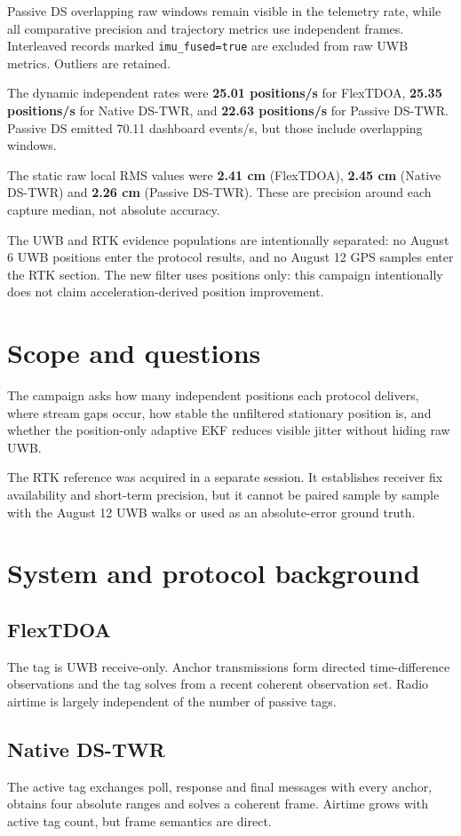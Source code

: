 \documentclass[10pt,a4paper]{article}
\begin{document}
Passive DS overlapping raw windows remain visible in the telemetry rate, while
all comparative precision and trajectory metrics use independent frames.
Interleaved records marked \texttt{imu\_fused=true} are excluded from raw UWB
metrics. Outliers are retained.

The dynamic independent rates were \textbf{25.01 positions/s} for FlexTDOA, \textbf{25.35 positions/s} for Native DS-TWR, and \textbf{22.63 positions/s} for Passive DS-TWR. Passive DS emitted 70.11 dashboard events/s, but those include overlapping windows.

The static raw local RMS values were \textbf{2.41 cm} (FlexTDOA), \textbf{2.45 cm} (Native DS-TWR) and \textbf{2.26 cm} (Passive DS-TWR). These are precision around each capture median, not absolute accuracy.


The UWB and RTK evidence populations are intentionally separated: no August 6
UWB positions enter the protocol results, and no August 12 GPS samples enter
the RTK section. The new filter uses positions only: this campaign intentionally
does not claim acceleration-derived position improvement.

\section{Scope and questions}
The campaign asks how many independent positions each protocol delivers, where
stream gaps occur, how stable the unfiltered stationary position is, and whether
the position-only adaptive EKF reduces visible jitter without hiding raw UWB.

The RTK reference was acquired in a separate session. It establishes receiver
fix availability and short-term precision, but it cannot be paired sample by
sample with the August 12 UWB walks or used as an absolute-error ground truth.

\section{System and protocol background}
\subsection{FlexTDOA}
The tag is UWB receive-only. Anchor transmissions form directed time-difference
observations and the tag solves from a recent coherent observation set. Radio
airtime is largely independent of the number of passive tags.

\subsection{Native DS-TWR}
The active tag exchanges poll, response and final messages with every anchor,
obtains four absolute ranges and solves a coherent frame. Airtime grows with
active tag count, but frame semantics are direct.
\end{document}

